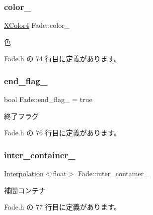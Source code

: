 \subsubsection{\texorpdfstring{color\+\_\+}{color\_}}
{\footnotesize\ttfamily \mbox{\hyperlink{_vector3_d_8h_a680c30c4a07d86fe763c7e01169cd6cc}{X\+Color4}} Fade\+::color\+\_\+\hspace{0.3cm}{\ttfamily [private]}}



色 



 Fade.\+h の 74 行目に定義があります。

\mbox{\label{class_fade_aeeddfe04f4dc156f2f4f0db903bb7fa1}} 
\subsubsection{\texorpdfstring{end\+\_\+flag\+\_\+}{end\_flag\_}}
{\footnotesize\ttfamily bool Fade\+::end\+\_\+flag\+\_\+ = true\hspace{0.3cm}{\ttfamily [private]}}



終了フラグ 



 Fade.\+h の 76 行目に定義があります。

\mbox{\label{class_fade_a2e7ace29a63666158f1b3b12ddf10be5}} 
\subsubsection{\texorpdfstring{inter\+\_\+container\+\_\+}{inter\_container\_}}
{\footnotesize\ttfamily \mbox{\hyperlink{class_interpolation}{Interpolation}}$<$float$>$ Fade\+::inter\+\_\+container\+\_\+\hspace{0.3cm}{\ttfamily [private]}}



補間コンテナ 



 Fade.\+h の 77 行目に定義があります。

\mbox{\label{class_fade_a60961f91ed0fc7aeae5fa957e90c7b0f}} 

